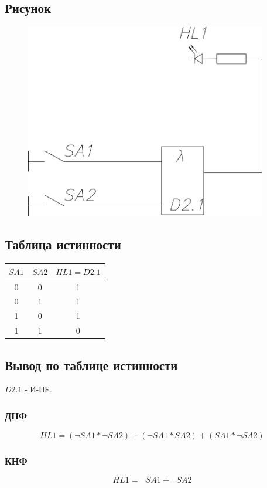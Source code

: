 \documentclass[a4paper]{article}
\begin{document}
\subsection{Рисунок}
\begin{figure}[H]
    \centering
    \includegraphics[width=300pt]{1.png}
\end{figure}

\subsection{Таблица истинности}
\begin{table}[H]
\centering
\begin{tabular}{|c|c|c|}
\hline
$SA1$ & $SA2$ & $HL1 = D2.1$ \\
\hline
0 & 0 & 1 \\
0 & 1 & 1 \\
1 & 0 & 1 \\
1 & 1 & 0 \\
\hline
\end{tabular}
\end{table}

\subsection{Вывод по таблице истинности}
$D2.1$ - И-НЕ.
\subsubsection{ДНФ}
$$ HL1 = (\neg SA1 * \neg SA2) + (\neg SA1 * SA2) + (SA1 * \neg SA2) $$
\subsubsection{КНФ}
$$ HL1 = \neg SA1 + \neg SA2 $$
\end{document}

